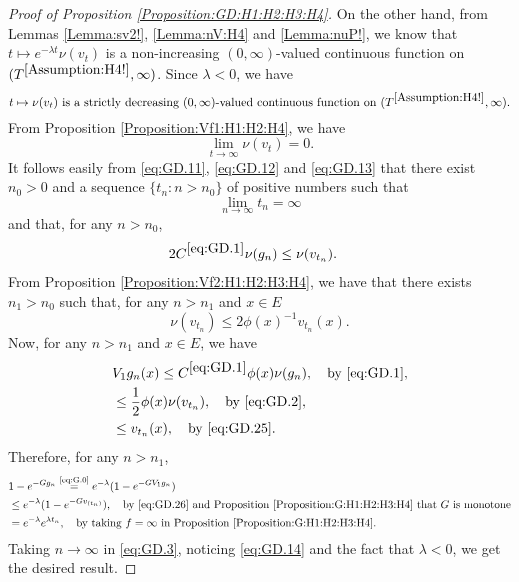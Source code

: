 \documentclass[12pt,a4paper]{amsart}
\numberwithin{equation}{section}
\theoremstyle{plain}
\theoremstyle{definition}
\theoremstyle{remark}
\newcounter{N}
\newcounter{n}[N]
\begin{document}
\begin{proof}[Proof of Proposition \ref{Proposition:GD:H1:H2:H3:H4}]
On the other hand, from Lemmas \ref{Lemma:sv2!}, \ref{Lemma:nV:H4} and \ref{Lemma:nuP!}, we know that $ t\mapsto e^{-\lambda t}\nu(v_t)$ is a non-increasing $(0,\infty)$-valued continuous function on $(T^{\ref{Assumption:H4!}},\infty)$.
Since $\lambda <0$, we have
\begin{equation}
\label{eq:GD.12}
\text{$ t\mapsto \nu(v_t)$ is a strictly decreasing $(0,\infty)$-valued continuous function on $(T^{\ref{Assumption:H4!}},\infty)$}.
\end{equation}
From Proposition \ref{Proposition:Vf1:H1:H2:H4}, we have
\begin{equation}
\label{eq:GD.13}
\lim_{t\to \infty}\nu(v_t) =0.
\end{equation}
It follows easily from \eqref{eq:GD.11}, \eqref{eq:GD.12} and \eqref{eq:GD.13} that there exist $n_0>0$ and a sequence $\{t_n: n>n_0\}$ of positive numbers such that
\begin{equation}
\label{eq:GD.14}
\lim_{n\to \infty} t_n = \infty
\end{equation}
and that, for any $n>n_0$,
\begin{align} \label{eq:GD.2}& 2C^{\eqref{eq:GD.1}} \nu(g_n) \leq \nu(v_{t_n}). \end{align}
From Proposition \ref{Proposition:Vf2:H1:H2:H3:H4}, we have that there exists $n_1 > n_0$ such that, for any $n>n_1$ and $x\in E$
\begin{equation}
\label{eq:GD.25}
\nu(v_{t_n})\leq 2\phi(x)^{-1} v_{t_n}(x).
\end{equation}
Now, for any $n>n_1$ and $x\in E$, we have
\begin{align}
& V_1g_n(x) \leq C^{\eqref{eq:GD.1}} \phi(x)\nu(g_n),\quad\text{by \eqref{eq:GD.1}},
\\& \leq \frac{1}{2}\phi(x)\nu(v_{t_n}),\quad\text{by \eqref{eq:GD.2}},
\\\label{eq:GD.26} & \leq v_{t_n}(x),\quad\text{by \eqref{eq:GD.25}}.\end{align}
Therefore, for any $n>n_1$,
\begin{align}
& 1 - e^{- Gg_n}
\overset{\text{\eqref{eq:G.0}}}= e^{- \lambda} (1- e^{- GV_1g_n})
\\&\leq e^{- \lambda} (1- e^{- G v_{(t_n)}}) ,\quad\text{by \eqref{eq:GD.26} and Proposition \ref{Proposition:G:H1:H2:H3:H4} that $G$ is monotone}
\\\label{eq:GD.3}&= e^{- \lambda} e^{\lambda t_n},\quad\text{by taking $f = \infty$ in Proposition \ref{Proposition:G:H1:H2:H3:H4}}.
\end{align}
Taking $n\to \infty$ in \eqref{eq:GD.3}, noticing \eqref{eq:GD.14} and the fact that $\lambda < 0$, we get the desired result.
\end{proof}
\end{document}
